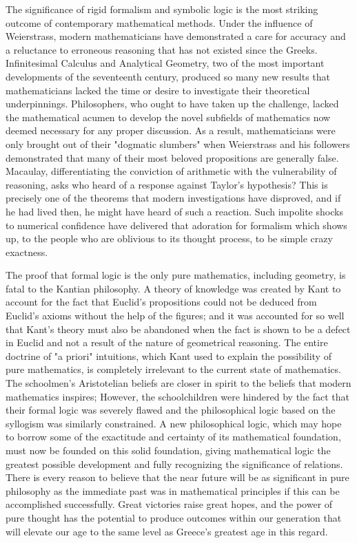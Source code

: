 \documentclass[a4paper,12pt]{book}[2004/02/16]
\theoremstyle{ilemma}
\theoremstyle{itheorem}
\theoremstyle{iother}
\theoremstyle{icorollary}
\theoremstyle{numcorollary}
\theoremstyle{idefinition}
\begin{document}
The significance of rigid formalism and symbolic logic is the most striking outcome of contemporary mathematical methods. Under the influence of Weierstrass, modern mathematicians have demonstrated a care for accuracy and a reluctance to erroneous reasoning that has not existed since the Greeks. Infinitesimal Calculus and Analytical Geometry, two of the most important developments of the seventeenth century, produced so many new results that mathematicians lacked the time or desire to investigate their theoretical underpinnings. Philosophers, who ought to have taken up the challenge, lacked the mathematical acumen to develop the novel subfields of mathematics now deemed necessary for any proper discussion. As a result, mathematicians were only brought out of their "dogmatic slumbers" when Weierstrass and his followers demonstrated that many of their most beloved propositions are generally false. Macaulay, differentiating the conviction
of arithmetic with the vulnerability of reasoning, asks who heard
of a response against Taylor's hypothesis? This is precisely one of the theorems that modern investigations have disproved, and if he had lived then, he might have heard of such a reaction. Such impolite
shocks to numerical confidence have delivered that adoration for formalism
which shows up, to the people who are oblivious to its thought process, to be simple
crazy exactness.

The proof that formal logic is the only pure mathematics, including geometry, is fatal to the Kantian philosophy. A theory of knowledge was created by Kant to account for the fact that Euclid's propositions could not be deduced from Euclid's axioms without the help of the figures; and it was accounted for so well that Kant's theory must also be abandoned when the fact is shown to be a defect in Euclid and not a result of the nature of geometrical reasoning. The entire doctrine of "a priori" intuitions, which Kant used to explain the possibility of pure mathematics, is completely irrelevant to the current state of mathematics. The schoolmen's Aristotelian beliefs are closer in spirit to the beliefs that modern mathematics inspires; However, the schoolchildren were hindered by the fact that their formal logic was severely flawed and the philosophical logic based on the syllogism was similarly constrained. A new philosophical logic, which may hope to borrow some of the exactitude and certainty of its mathematical foundation, must now be founded on this solid foundation, giving mathematical logic the greatest possible development and fully recognizing the significance of relations. There is every reason to believe that the near future will be as significant in pure philosophy as the immediate past was in mathematical principles if this can be accomplished successfully. Great victories raise great hopes, and the power of pure thought has the potential to produce outcomes within our generation that will elevate our age to the same level as Greece's greatest age in this regard.
\end{document}
